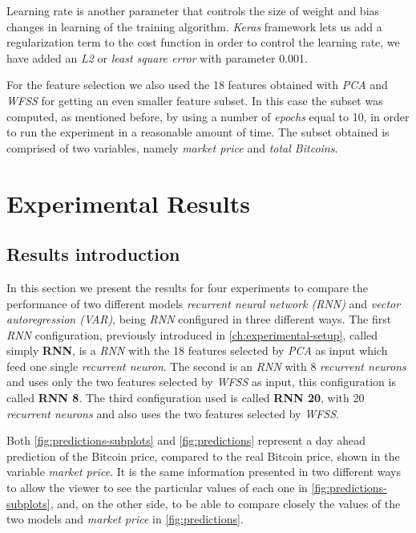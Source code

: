 Learning rate is another parameter that controls the size of weight
and bias changes in learning of the training algorithm. \textit{Keras}
framework lets us add a regularization term to the cost function in
order to control the learning rate, we have added an \textit{L2} or
\textit{least square error} with parameter 0.001.


For the feature selection we also used the 18 features obtained with
\textit{PCA} and \textit{WFSS} for getting an even smaller feature
subset. In this case the subset was computed, as mentioned before, by
using a number of \textit{epochs} equal to 10, in order to run the
experiment in a reasonable amount of time. The subset obtained is
comprised of two variables, namely \textit{market price} and
\textit{total Bitcoins}.

\chapter{Experimental Results}
\label{ch:experimental-results}

\section{Results introduction}
\label{sec:result-presentation}


In this section we present the results for four experiments to compare
the performance of two different models \textit{recurrent neural
network (RNN)} and \textit{vector autoregression (VAR)}, being
\textit{RNN} configured in three different ways. The first
\textit{RNN} configuration, previously introduced in
\autoref{ch:experimental-setup}, called simply \textbf{RNN}, is a
\textit{RNN} with the 18 features selected by \textit{PCA} as input
which feed one single \textit{recurrent neuron}. The second is an
\textit{RNN} with 8 \textit{recurrent neurons} and uses only the two
features selected by \textit{WFSS} as input, this configuration is
called \textbf{RNN 8}. The third configuration used is called
\textbf{RNN 20}, with 20 \textit{recurrent neurons} and also uses the
two features selected by \textit{WFSS}.

Both \autoref{fig:predictions-subplots} and \autoref{fig:predictions}
represent a day ahead prediction of the Bitcoin price, compared to the
real Bitcoin price, shown in the variable \textit{market price}. It is
the same information presented in two different ways to allow the
viewer to see the particular values of each one in
\autoref{fig:predictions-subplots}, and, on the other side, to be able
to compare closely the values of the two models and \textit{market
price} in \autoref{fig:predictions}.

